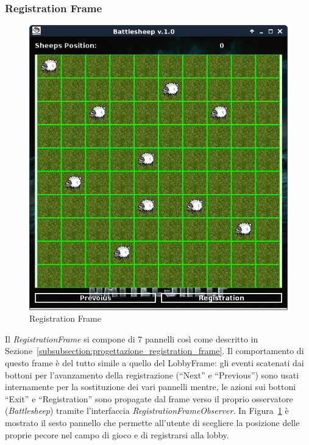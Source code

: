 \subsubsection{Registration Frame}
\begin{figure}[!h]
	\centering
	\includegraphics[scale=0.5]{core/imgs/gui/registration_frame}
	\caption{Registration Frame}
	\label{figure:registration_frame}
\end{figure}
Il \textit{RegistrationFrame} si compone di 7 pannelli così come descritto in
Sezione~\ref{subsubsection:progettazione_registration_frame}.\newline
Il comportamento di questo frame è del tutto simile a quello del LobbyFrame: gli
eventi scatenati dai bottoni per l'avanzamento della registrazione (``Next'' e
``Previous'') sono usati internamente per la sostituzione dei vari pannelli
mentre, le azioni sui bottoni ``Exit'' e ``Registration'' sono propagate dal
frame verso il proprio osservatore (\textit{Battlesheep}) tramite l'interfaccia
\textit{RegistrationFrameObserver}.\newline
In Figura~\ref{figure:registration_frame} è mostrato il sesto pannello che
permette all'utente di scegliere la posizione delle proprie pecore nel campo di
gioco e di registrarsi alla lobby.




